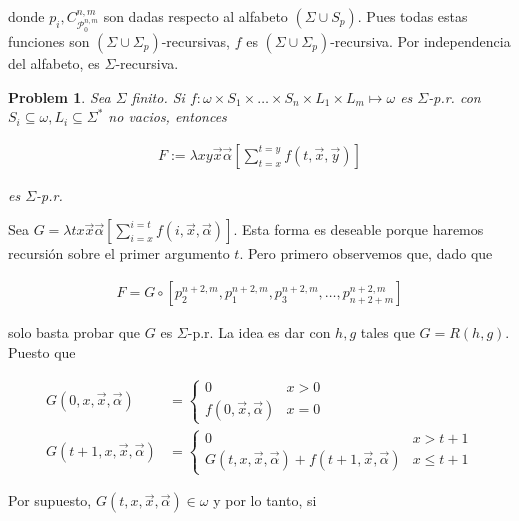 \documentclass[a4paper, 12pt]{article}
\newtheorem{problem}{Problem}
\newtheorem{problem}{Problem}
\begin{document}
donde $p_i, C_{\mathcal{P}_0^{n, m}}^{n, m}$ son dadas respecto al alfabeto $(\Sigma
\cup S_p)$. Pues todas estas funciones son $(\Sigma \cup \Sigma_p)$-recursivas, $f$ es $(\Sigma
\cup \Sigma_p)$-recursiva. Por independencia del alfabeto, es $\Sigma$-recursiva.

\pagebreak 

\begin{problem}
    Sea $\Sigma$ finito. Si $f : \omega \times S_1 \times  \ldots \times S_n
    \times L_1 \times L_m \mapsto \omega$ es $\Sigma$-p.r. con $S_i \subseteq
    \omega, L_i \subseteq \Sigma^{*}$ no vacios, entonces 

    \begin{align*}
        F := \lambda xy \vec{x}\vec{\alpha} \left[ \sum_{t=x}^{t=y} f(t, \vec{x},
        \vec{y})  \right]
    \end{align*}

    es $\Sigma$-p.r. 
\end{problem}

Sea $G = \lambda tx \vec{x}\vec{\alpha} \left[ \sum_{i = x}^{i = t} f(i,
\vec{x}, \vec{\alpha})  \right]$. Esta forma es deseable porque haremos
recursión sobre el primer argumento $t$. Pero primero observemos que, dado que

\begin{align*}
    F = G \circ \left[ p_2^{n+2, m}, p_{1}^{n+2, m}, p_3^{n+2, m}, \ldots, p_{n
    + 2 + m}^{n+2, m} \right] 
\end{align*}

solo basta probar que $G$ es $\Sigma$-p.r. La idea es dar con $h, g$ tales que
$G = R(h, g)$. Puesto que

\begin{align*}
    G(0, x, \vec{x}, \vec{\alpha}) &= \begin{cases}
        0 & x > 0 \\ 
        f(0, \vec{x}, \vec{\alpha}) & x = 0
    \end{cases} \\ 
        G(t + 1, x, \vec{x}, \vec{\alpha}) &= \begin{cases}
            0 & x > t + 1 \\ 
            G(t, x, \vec{x}, \vec{\alpha}) + f(t + 1, \vec{x}, \vec{\alpha}) & x
            \leq t+1
        \end{cases}
\end{align*}

Por supuesto, $G(t, x, \vec{x}, \vec{\alpha}) \in \omega$ y por lo tanto, si
\end{document}
